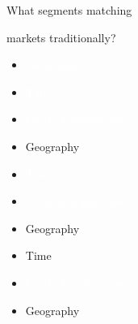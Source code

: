 \documentclass[12pt]{beamer}
\newcommand*\ouritem{%
\item[\color{black}\scalebox{0.9}{\textbullet}]}
\newcommand*\imgitem{%
\item[\color{white}\scalebox{0.9}{\textbullet}]}
\begin{document}
\begin{frame}{}
\begin{center}
What segments matching

markets traditionally?
\end{center}

\begin{animateinline}[autoplay]{2}
\begin{minipage}{\textwidth}
\Large
\vspace{1 mm}
\begin{itemize}
\imgitem \textcolor{white}{Geography}

\imgitem \textcolor{white}{Time}

\imgitem \textcolor{white}{Costs of application}
\end{itemize}

\nointerlineskip
\begin{tikzpicture}[overlay]
\end{tikzpicture}
\end{minipage}
\newframe
\begin{minipage}{\textwidth}
\Large
\vspace{1 mm}
\begin{itemize}
\ouritem Geography

\imgitem \textcolor{white}{Time}

\imgitem \textcolor{white}{Costs of application}
\end{itemize}

\nointerlineskip
\begin{tikzpicture}[overlay]
\end{tikzpicture}
\end{minipage}
\newframe
\begin{minipage}{\textwidth}
\Large
\vspace{1 mm}
\begin{itemize}
\ouritem Geography

\ouritem Time

\imgitem \textcolor{white}{Costs of application}
\end{itemize}

\nointerlineskip
\begin{tikzpicture}[overlay]
\end{tikzpicture}
\end{minipage}
\newframe
\begin{minipage}{\textwidth}
\Large
\vspace{1 mm}
\begin{itemize}
\ouritem Geography


\end{itemize}
\end{minipage}
\end{animateinline}
\end{frame}
\end{document}
